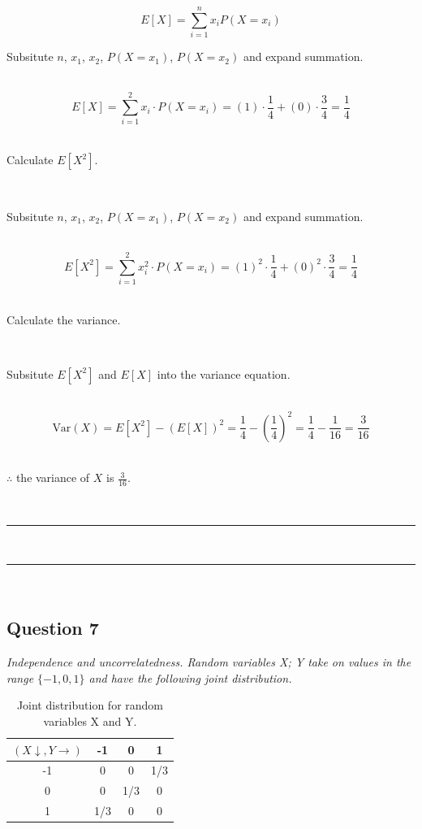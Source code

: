 \documentclass{article}
\begin{document}
$$E[X] = \sum^{n}_{i=1} x_i P(X = x_i)$$

\parbox{\textwidth}{Subsitute $n$, $x_1$, $x_2$, $P(X = x_1)$, $P(X = x_2)$ and expand summation.}\\

$$E[X] = \sum^2_{i=1} x_i \cdot P(X = x_i) = (1) \cdot \frac{1}{4} + (0) \cdot \frac{3}{4} = \frac{1}{4} $$\\

\parbox{\textwidth}{Calculate $E[X^2]$.}\\

\parbox{\textwidth}{Subsitute $n$, $x_1$, $x_2$, $P(X = x_1)$, $P(X = x_2)$ and expand summation.}\\

$$E[X^2] = \sum^2_{i=1} x_i^2 \cdot P(X = x_i) = (1)^2 \cdot \frac{1}{4} + (0)^2 \cdot \frac{3}{4} = \frac{1}{4}$$\\

\parbox{\textwidth}{Calculate the variance.}\\

\parbox{\textwidth}{Subsitute $E[X^2]$ and $E[X]$ into the variance equation.}\\

$$\text{Var}(X) = E[X^2] - (E[X])^2 = \frac{1}{4} - (\frac{1}{4})^2 = \frac{1}{4} - \frac{1}{16} = \frac{3}{16}$$\\

\parbox{\textwidth}{$\therefore$ the variance of $X$ is $\frac{3}{16}$.}\\

\noindent\rule{\textwidth}{0.4pt}\\
\noindent\rule{\textwidth}{0.4pt}\\

\newpage

\subsection*{Question 7}
\textit{Independence and uncorrelatedness. Random variables X; Y take on values in the range $\{-1,0,1\}$ and have the following joint distribution.}\\

\begin{table}[h]
\centering
\begin{tabular}{c|ccc}
  $(X\downarrow ,Y \rightarrow)$ & -1 & 0 & 1 \\ \hline
-1 & 0 & 0 & 1/3 \\
 0 & 0 & 1/3 & 0 \\
 1 & 1/3 & 0 & 0 \\
\end{tabular}
\caption{Joint distribution for random variables X and Y.}
\label{tab:example_fractions}
\end{table}
\end{document}
